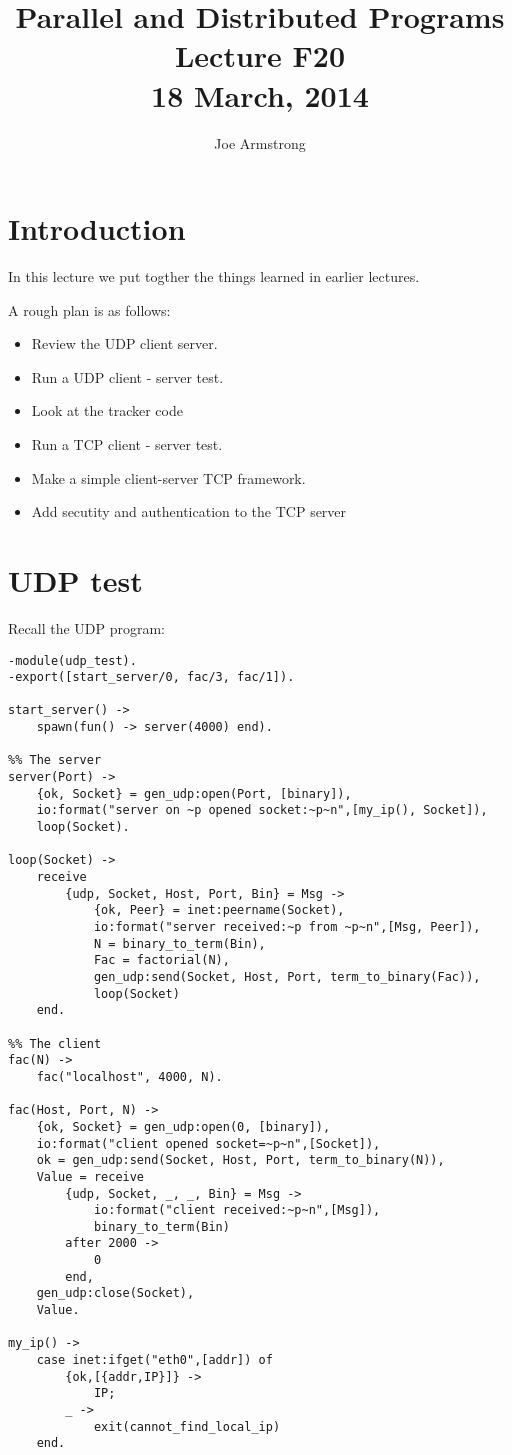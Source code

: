 \documentclass[10pt]{article}
\title{Parallel and Distributed Programs\\
Lecture F20\\
18 March, 2014
}
\author{Joe Armstrong}
\begin{document}
\maketitle

\tableofcontents

\section{Introduction}

In this lecture we put togther the things learned in earlier lectures.

A rough plan is as follows:

\begin{itemize}
\item Review the UDP client server.
\item Run a UDP client - server test.
\item Look at the tracker code
\item Run a TCP client - server test.
\item Make a simple client-server TCP framework.
\item Add secutity and authentication to the TCP server
\end{itemize}

\section{UDP test}

Recall the UDP program:

\begin{Verbatim}
-module(udp_test).
-export([start_server/0, fac/3, fac/1]).

start_server() ->
    spawn(fun() -> server(4000) end).

%% The server             
server(Port) ->
    {ok, Socket} = gen_udp:open(Port, [binary]),
    io:format("server on ~p opened socket:~p~n",[my_ip(), Socket]),
    loop(Socket).

loop(Socket) ->
    receive
        {udp, Socket, Host, Port, Bin} = Msg ->
            {ok, Peer} = inet:peername(Socket),
            io:format("server received:~p from ~p~n",[Msg, Peer]),
            N = binary_to_term(Bin),
            Fac = factorial(N),
            gen_udp:send(Socket, Host, Port, term_to_binary(Fac)),
            loop(Socket)
    end.
    
%% The client
fac(N) ->
    fac("localhost", 4000, N).

fac(Host, Port, N) ->
    {ok, Socket} = gen_udp:open(0, [binary]),
    io:format("client opened socket=~p~n",[Socket]),
    ok = gen_udp:send(Socket, Host, Port, term_to_binary(N)),
    Value = receive
		{udp, Socket, _, _, Bin} = Msg ->
		    io:format("client received:~p~n",[Msg]),
		    binary_to_term(Bin)
	    after 2000 ->
		    0
	    end,
    gen_udp:close(Socket),
    Value.

my_ip() ->
    case inet:ifget("eth0",[addr]) of
        {ok,[{addr,IP}]} ->
            IP;
        _ ->
            exit(cannot_find_local_ip)
    end.
\end{Verbatim}
\end{document}
